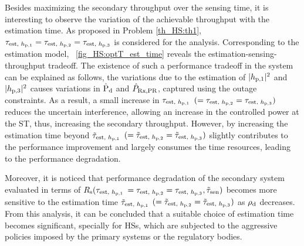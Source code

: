 Besides maximizing the secondary throughput over the sensing time, it is interesting to observe the variation of the achievable throughput with the estimation time.
As proposed in Problem \ref{th_HS:th1}, $\tau_{\text{est, $h_{\text{p,1}}$}} = \tau_{\text{est, $h_{\text{p,2}}$}} = \tau_{\text{est, $h_{\text{p,3}}$}}$ is considered for the analysis. Corresponding to the estimation model, \figurename~\ref{fig_HS:optT_est_time} reveals the estimation-sensing-throughput tradeoff. The existence of such a performance tradeoff in the system can be explained as follows, the variations due to the estimation of $|h_{\text{p,1}}|^2$ and $|h_{\text{p,3}}|^2$ causes variations in $\hat{\text{P}}_{\text{d}}$ and $\hat{P}_{\text{Rx,PR}}$, captured using the outage constraints. As a result, a small increase in $\tau_{\text{est, $h_{\text{p,1}}$}}$ $(= \tau_{\text{est, $h_{\text{p,2}}$}} = \tau_{\text{est, $h_{\text{p,3}}$}})$ reduces the uncertain interference, allowing an increase in the controlled power at the ST, thus, increasing the secondary throughput. However, by increasing the estimation time beyond $\tilde{\tau}_{\text{est, $h_{\text{p,1}}$}}$ $(= \tilde{\tau}_{\text{est, $h_{\text{p,2}}$}}= \tilde{\tau}_{\text{est, $h_{\text{p,3}}$}})$ slightly contributes to the performance improvement and largely consumes the time resources, leading to the performance degradation. 

Moreover, it is noticed that performance degradation of the secondary system evaluated in terms of $R_{\text{s}}(\tau_{\text{est, $h_{\text{p,1}}$}}$ $= \tau_{\text{est, $h_{\text{p,2}}$}} = \tau_{\text{est, $h_{\text{p,3}}$}}, \tilde{\tau}_{\text{sen}})$ becomes more sensitive to the estimation time $\tilde{\tau}_{\text{est, $h_{\text{p,1}}$}}$ $(= \tilde{\tau}_{\text{est, $h_{\text{p,2}}$}}= \tilde{\tau}_{\text{est, $h_{\text{p,3}}$}})$ as $\rho_{\text{d}}$ decreases. From this analysis, it can be concluded that a suitable choice of estimation time becomes significant, specially for HSs, which are subjected to the aggressive policies imposed by the primary systems or the regulatory bodies. 


